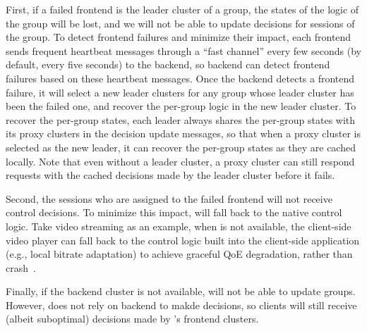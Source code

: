 First, if a failed frontend is the leader cluster of a group, the states of the \mab logic of the group will be lost, and we will not be able to update decisions for sessions of the group.
To detect frontend failures and minimize their impact, each frontend sends frequent heartbeat messages through a ``fast channel'' every few seconds (by default, every five seconds) to the backend, so backend can detect frontend failures based on these heartbeat messages.
Once the backend detects a frontend failure, it will select a new leader clusters for any group whose leader cluster has been the failed one,
and recover the per-group logic in the new leader cluster.
To recover the per-group states,  each leader always shares the per-group states with its proxy clusters in the decision update messages, so that when a proxy cluster is selected as the new leader, it can recover the per-group states as they are cached locally.
Note that even without a leader cluster, a proxy cluster can still respond requests with the cached decisions made by the leader cluster before it fails.


Second, the sessions who are assigned to the failed frontend will not  receive control decisions.
To minimize this impact, \name will fall back to the native control logic.
Take video streaming as an example, when \name is not available, the client-side video player can fall back to the control logic built into the client-side application (e.g., local bitrate adaptation) to achieve graceful QoE degradation, rather than crash~\cite{c3}.

Finally, if the backend cluster is not available, \name will not be able to update groups.
However, \name does not rely on backend to makde decisions, so clients will still receive (albeit suboptimal) decisions made by \name's frontend clusters. %







